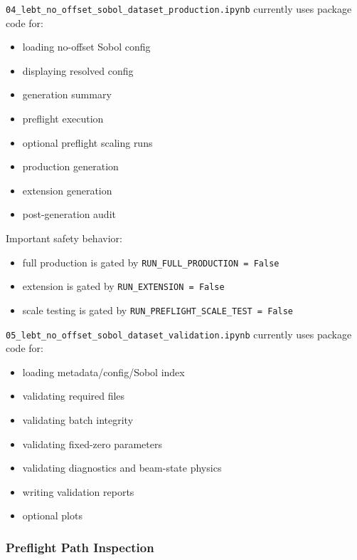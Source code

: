\documentclass[
]{article}
\providecommand{\tightlist}{%
  \setlength{\itemsep}{0pt}\setlength{\parskip}{0pt}}
\begin{document}
\texttt{04\_lebt\_no\_offset\_sobol\_dataset\_production.ipynb}
currently uses package code for:

\begin{itemize}
\tightlist
\item
  loading no-offset Sobol config
\item
  displaying resolved config
\item
  generation summary
\item
  preflight execution
\item
  optional preflight scaling runs
\item
  production generation
\item
  extension generation
\item
  post-generation audit
\end{itemize}

Important safety behavior:

\begin{itemize}
\tightlist
\item
  full production is gated by \texttt{RUN\_FULL\_PRODUCTION\ =\ False}
\item
  extension is gated by \texttt{RUN\_EXTENSION\ =\ False}
\item
  scale testing is gated by
  \texttt{RUN\_PREFLIGHT\_SCALE\_TEST\ =\ False}
\end{itemize}

\texttt{05\_lebt\_no\_offset\_sobol\_dataset\_validation.ipynb}
currently uses package code for:

\begin{itemize}
\tightlist
\item
  loading metadata/config/Sobol index
\item
  validating required files
\item
  validating batch integrity
\item
  validating fixed-zero parameters
\item
  validating diagnostics and beam-state physics
\item
  writing validation reports
\item
  optional plots
\end{itemize}

\hypertarget{preflight-path-inspection}{%
\subsubsection{Preflight Path
Inspection}\label{preflight-path-inspection}}
\end{document}
